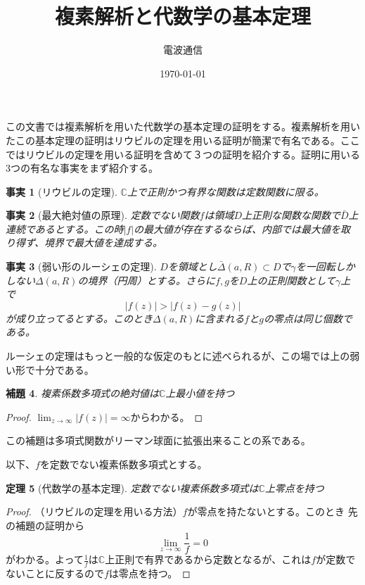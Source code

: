 \documentclass{jsarticle}
\title{複素解析と代数学の基本定理}
\author{電波通信}
\date{\today}
\newtheorem{thm}{定理}
\newtheorem{lemma}[thm]{補題}
\newtheorem{fact}[thm]{事実}
\newcommand{\cc}{\mathbb{C}}
\begin{document}
\maketitle
この文書では複素解析を用いた代数学の基本定理の証明をする。複素解析を用いたこの基本定理の証明はリウビルの定理を用いる証明が簡潔で有名である。ここではリウビルの定理を用いる証明を含めて３つの証明を紹介する。証明に用いる3つの有名な事実をまず紹介する。

\begin{fact}[リウビルの定理]
$\cc$上で正則かつ有界な関数は定数関数に限る。
\end{fact}

\begin{fact}[最大絶対値の原理]
定数でない関数$f$は領域$D$上正則な関数な関数で$\bar{D}$上連続であるとする。この時$|f|$の最大値が存在するならば、内部では最大値を取り得ず、境界で最大値を達成する。
\end{fact}

\begin{fact}[弱い形のルーシェの定理]$D$を領域とし$\bar{\Delta}(a,R)\subset D$で$\gamma$を一回転しかしない$\Delta(a,R)$の境界（円周）とする。さらに$f,g$を$D$上の正則関数として$\gamma$上で
\[
|f(z)|>|f(z)-g(z)|
\]
が成り立ってるとする。このとき$\Delta(a,R)$に含まれる$f$と$g$の零点は同じ個数である。
\end{fact}
ルーシェの定理はもっと一般的な仮定のもとに述べられるが、この場では上の弱い形で十分である。

\begin{lemma}複素係数多項式の絶対値は$\cc$上最小値を持つ

\end{lemma}
\begin{proof}$\displaystyle \lim_{z\rightarrow \infty}|f(z)|=\infty$からわかる。
\end{proof}
この補題は多項式関数がリーマン球面に拡張出来ることの系である。

以下、$f$を定数でない複素係数多項式とする。

\begin{thm}[代数学の基本定理]定数でない複素係数多項式は$\cc$上零点を持つ
\end{thm}
\begin{proof}（リウビルの定理を用いる方法）$f$が零点を持たないとする。このとき
先の補題の証明から
\[
\lim_{z\rightarrow \infty}\frac{1}{f}=0
\]
がわかる。よって$\displaystyle \frac{1}{f}$は$\cc$上正則で有界であるから定数となるが、これは$f$が定数でないことに反するので$f$は零点を持つ。
\end{proof}
\end{document}
